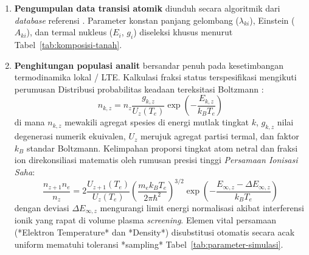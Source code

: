 \documentclass[12pt, a4paper]{article}
\begin{document}
\begin{enumerate}[label=\arabic*., leftmargin=2cm]
    \item \textbf{Pengumpulan data transisi atomik} diunduh secara algoritmik dari \textit{database} referensi \citep{kramida2024}. Parameter konstan panjang gelombang ($\lambda_{ki}$), Einstein ($A_{ki}$), dan termal nukleus ($E_i$, $g_i$) diseleksi khusus menurut Tabel~\ref{tab:komposisi-tanah}.
    \item \textbf{Penghitungan populasi analit} bersandar penuh pada kesetimbangan termodinamika lokal / LTE. Kalkulasi fraksi status terspesifikasi mengikuti perumusan Distribusi probabilitas keadaan tereksitasi Boltzmann \citep{fujimoto2004}:
    \begin{equation}
        n_{k,z} = n_z \frac{g_{k,z}}{U_z(T_e)} \exp\left(-\frac{E_{k,z}}{k_B T_e}\right)
        \label{eq:boltzmann}
    \end{equation}
    di mana $n_{k,z}$ mewakili agregat spesies di energi mutlak tingkat $k$,  $g_{k,z}$ nilai degenerasi numerik ekuivalen, $U_z$ merujuk agregat partisi termal, dan faktor $k_B$ standar Boltzmann. Kelimpahan proporsi tingkat atom netral dan fraksi ion direkonsiliasi matematis oleh rumusan presisi tinggi \textit{Persamaan Ionisasi Saha}:
    \begin{equation}
        \frac{n_{z+1} n_e}{n_z} = 2 \frac{U_{z+1}(T_e)}{U_z(T_e)} \left(\frac{m_e k_B T_e}{2\pi \hbar^2}\right)^{3/2} \exp\left(-\frac{E_{\infty,z}-\Delta E_{\infty,z}}{k_B T_e}\right)
        \label{eq:saha}
    \end{equation}
    dengan deviasi $\Delta E_{\infty,z}$ mengurangi limit energi normalisasi akibat interferensi ionik yang rapat di volume plasma \textit{screening}. Elemen vital persamaan (*Elektron Temperature* dan *Density*)  disubstitusi otomatis secara acak uniform mematuhi toleransi *sampling* Tabel~\ref{tab:parameter-simulasi}.


\end{enumerate}
\end{document}
